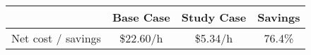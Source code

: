 \begin{tabular}{|l|c|c|c|}
\hline
 & Base Case & Study Case & Savings \\ \hline
Net cost / savings & \$22.60/h & \$5.34/h & 76.4\%
\\ \hline
\end{tabular}
